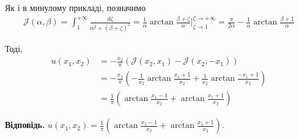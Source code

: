 \documentclass{hw_template}
\begin{document}
Як і в минулому прикладі, позначимо
\begin{align*}
    \mathcal{J}(\alpha,\beta) = \int_1^{+\infty} \frac{d\zeta}{\alpha^2 + (\beta + \zeta)^2} = \frac{1}{\alpha}\arctan \frac{\beta+\zeta}{\alpha}\Big|_{\zeta \to 1}^{\zeta \to +\infty} = \frac{\pi}{2\alpha} - \frac{1}{\alpha}\arctan \frac{\beta+1}{\alpha}
\end{align*}

Тоді, 
\begin{align*}
    u(x_1,x_2) &= -\frac{x_2}{\pi}\left(\mathcal{J}(x_2,x_1) - \mathcal{J}(x_2,-x_1)\right) \\
    &= -\frac{x_2}{\pi}\left(-\frac{1}{x_2}\arctan \frac{x_1+1}{x_2} + \frac{1}{x_2}\arctan \frac{-x_1+1}{x_2} \right) \\
    &= \frac{1}{\pi}\left(\arctan \frac{x_1-1}{x_2} + \arctan \frac{x_1+1}{x_2}\right)
\end{align*}

\textbf{Відповідь.} $u(x_1,x_2) = \frac{1}{\pi}\left(\arctan \frac{x_1-1}{x_2} + \arctan \frac{x_1+1}{x_2}\right)$.
\end{document}
